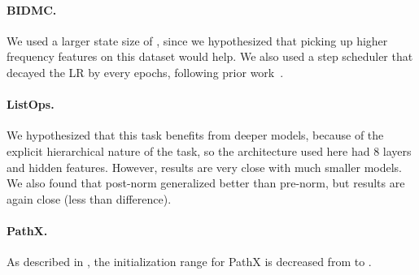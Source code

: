 \documentclass{article}
\begin{document}
\paragraph{BIDMC.}
We used a larger state size of , since we hypothesized that picking up higher frequency features on this dataset would help.
We also used a step scheduler that decayed the LR by  every  epochs, following prior work~\citep{rusch2021unicornn,gu2021lssl}.

\paragraph{ListOps.}
We hypothesized that this task benefits from deeper models, because of the explicit hierarchical nature of the task,
so the architecture used here had 8 layers and  hidden features.
However, results are very close with much smaller models.
We also found that post-norm generalized better than pre-norm, but results are again close (less than  difference).

\paragraph{PathX.}
As described in \citep{gu2022hippo}, the initialization range for PathX is decreased from  to .
\end{document}
